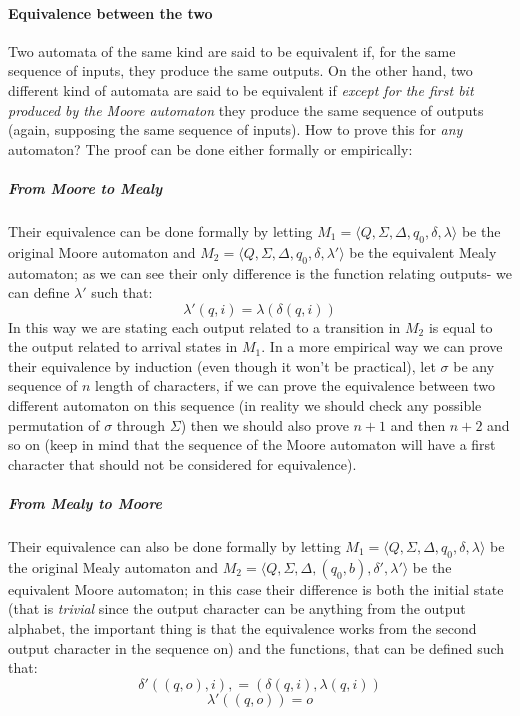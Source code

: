 \documentclass{scrartcl}
\begin{document}
    \paragraph{Equivalence between the two} Two automata of the same kind are said to be equivalent if, for the same sequence of inputs, they produce the same outputs. On the other hand, two different kind of automata are said to be equivalent if \emph{except for the first bit produced by the Moore automaton} they produce the same sequence of outputs (again, supposing the same sequence of inputs). How to prove this for \emph{any} automaton? The proof can be done either formally or empirically:
    \subparagraph{From Moore to Mealy} Their equivalence can be done formally by letting $M_1=\langle Q,\Sigma, \Delta, q_0, \delta, \lambda\rangle$ be the original Moore automaton and $M_2=\langle Q, \Sigma, \Delta, q_0, \delta, \lambda'\rangle$ be the equivalent Mealy automaton; as we can see their only difference is the function relating outputs- we can define $\lambda'$ such that:
    \begin{equation*}
        \lambda'(q,i)=\lambda(\delta(q,i))
    \end{equation*}
    In this way we are stating each output related to a transition in $M_2$ is equal to the output related to arrival states in $M_1$.
    In a more empirical way we can prove their equivalence by induction (even though it won't be practical), let $\sigma$ be any sequence of $n$ length of characters, if we can prove the equivalence between two different automaton on this sequence (in reality we should check any possible permutation of $\sigma$ through $\Sigma$) then we should also prove $n+1$ and then $n+2$ and so on (keep in mind that the sequence of the Moore automaton will have a first character that should not be considered for equivalence).
    \subparagraph{From Mealy to Moore} Their equivalence can also be done formally by letting $M_1=\langle Q,\Sigma, \Delta, q_0, \delta, \lambda\rangle$ be the original Mealy automaton and $M_2=\langle Q, \Sigma, \Delta, (q_0,b), \delta', \lambda'\rangle$ be the equivalent Moore automaton; in this case their difference is both the initial state (that is \emph{trivial} since the output character can be anything from the output alphabet, the important thing is that the equivalence works from the second output character in the sequence on) and the functions, that can be defined such that:
    \begin{equation*}
        \delta'((q, o),i), = (\delta(q, i), \lambda(q, i))
    \end{equation*}
    \begin{equation*}
        \lambda'((q, o)) = o
    \end{equation*}
\end{document}

